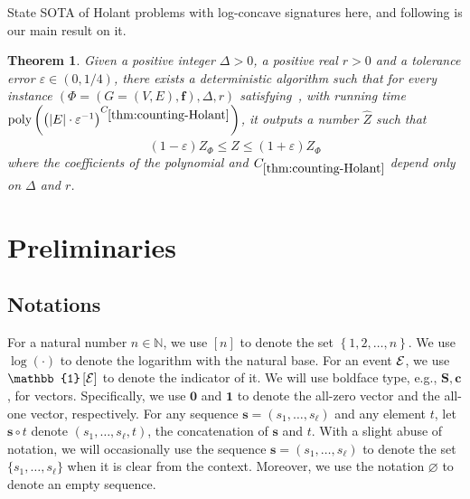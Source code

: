 \documentclass[11pt]{article}
\newtheorem{theorem}{Theorem}
\newcommand{\abs}[1]{\left\vert#1\right\vert}
\newcommand{\set}[1]{\left\{#1\right\}}
\newcommand{\defeq}{\triangleq} \renewcommand{\d}{\,\-d}
\newcommand{\id}[1]{\mathbb{1}\left[#1\right]}
\def\poly{\mathrm{poly}}
\newcommand{\wh}[1]{\widehat{#1}}
\newcommand{\vecf}{\boldsymbol{f}}
\newcommand{\seqS}{\boldsymbol{s}}
\newcommand{\zdnew}[1]{{\color{cyan} #1}}
\begin{document}
\zdnew{State SOTA of Holant problems with log-concave signatures here, and following is our main result on it.}

\begin{theorem} \label{thm:counting-Holant}
    Given a positive integer $\Delta > 0$, a positive real $r > 0$ and a tolerance error $\varepsilon \in (0, 1/4)$, there exists a deterministic algorithm such that for every instance $(\Phi = (G = (V, E), \vecf), \Delta, r)$ satisfying~, with running time $\poly\left(\left(\abs{E} \cdot \varepsilon^{-1}\right)^{C_{\ref{thm:counting-Holant}}}\right)$, it outputs a number $\wh{Z}$ such that
    $$
        (1 - \varepsilon) Z_\Phi \le \wh{Z} \le (1 + \varepsilon) Z_{\Phi}
    $$
    where the coefficients of the polynomial and $C_{\ref{thm:counting-Holant}}$ depend only on $\Delta$ and $r$.
\end{theorem}

\section{Preliminaries}


\subsection{Notations}

For a natural number $n \in \mathbb N$, we use $[n]$ to denote the set $\set{1, 2, \ldots, n}$.
We use $\log(\cdot)$ to denote the logarithm with the natural base.
For an event $\mathcal{E}$, we use $\id{\+E}$ to denote the indicator of it. 
We will use boldface type, e.g., $\boldsymbol{S},\boldsymbol{c}$, for vectors.
Specifically, we use $\boldsymbol{0}$ and $\boldsymbol{1}$ to denote the all-zero vector and the all-one vector, respectively.
For any sequence $\seqS = (s_1, \ldots, s_\ell)$ and any element $t$, let $\seqS \circ t$ denote $(s_1, \ldots, s_\ell,t)$, the concatenation of $\seqS$ and $t$.
With a slight abuse of notation, we will occasionally use the sequence $\seqS= (s_1, \ldots, s_\ell)$ to denote the set $\{s_1, \ldots, s_\ell\}$ when it is clear from the context.
Moreover, we use the notation $\varnothing$ to denote an empty sequence.
\end{document}
